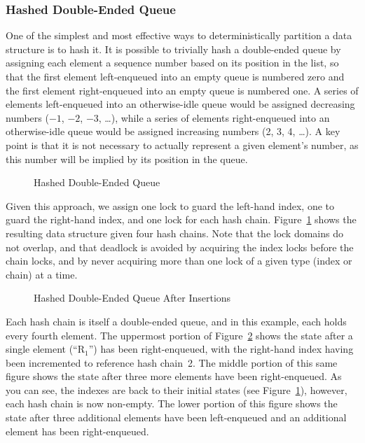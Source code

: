 \subsubsection{Hashed Double-Ended Queue}
\label{sec:SMPdesign:Hashed Double-Ended Queue}

One of the simplest and most effective ways to deterministically
partition a data structure is to hash it.
It is possible to trivially hash a double-ended queue by assigning
each element a sequence number based on its position in the list,
so that the first element left-enqueued into an empty queue is numbered
zero and the first element right-enqueued into an empty queue is numbered
one.
A series of elements left-enqueued into an otherwise-idle queue would
be assigned decreasing numbers ($-1$, $-2$, $-3$, \ldots), while a series of
elements right-enqueued into an otherwise-idle queue would be assigned
increasing numbers (2, 3, 4, \ldots).
A key point is that it is not necessary to actually represent a given
element's number, as this number will be implied by its position in
the queue.

\begin{figure}[tb]
\centering
{}
\caption{Hashed Double-Ended Queue}
\label{fig:SMPdesign:Hashed Double-Ended Queue}
\end{figure}

Given this approach, we assign one lock to guard the left-hand index,
one to guard the right-hand index, and one lock for each hash chain.
Figure~\ref{fig:SMPdesign:Hashed Double-Ended Queue} shows the resulting
data structure given four hash chains.
Note that the lock domains do not overlap, and that deadlock is avoided
by acquiring the index locks before the chain locks, and by never
acquiring more than one lock of a given type (index or chain) at a time.

\begin{figure}[tb]
\centering
{}
\caption{Hashed Double-Ended Queue After Insertions}
\label{fig:SMPdesign:Hashed Double-Ended Queue After Insertions}
\end{figure}

Each hash chain is itself a double-ended queue, and in this example,
each holds every fourth element.
The uppermost portion of
Figure~\ref{fig:SMPdesign:Hashed Double-Ended Queue After Insertions}
shows the state after a single element (``R$_1$'') has been
right-enqueued, with the right-hand index having been incremented to
reference hash chain~2.
The middle portion of this same figure shows the state after
three more elements have been right-enqueued.
As you can see, the indexes are back to their initial states
(see Figure~\ref{fig:SMPdesign:Hashed Double-Ended Queue}), however,
each hash chain is now non-empty.
The lower portion of this figure shows the state after three additional
elements have been left-enqueued and an additional element has been
right-enqueued.

